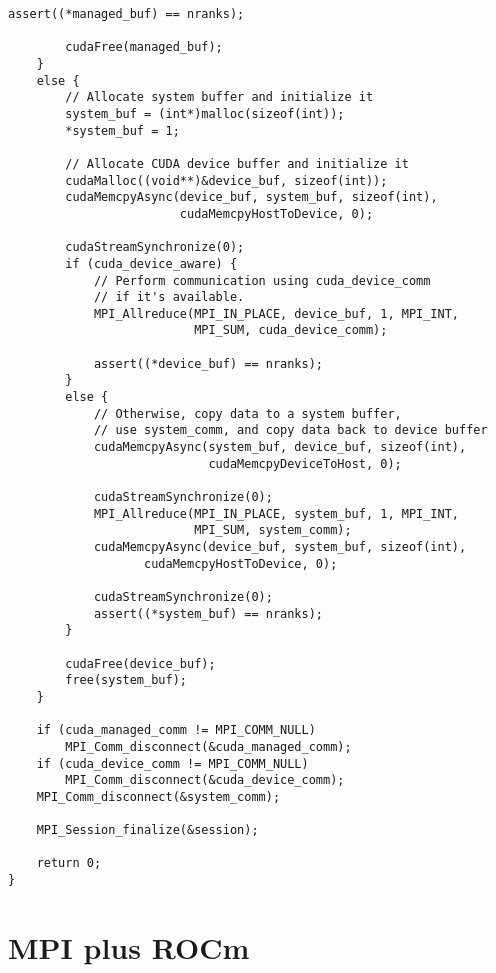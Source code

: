 \begin{example}
\begin{lstlisting}[language={[MPI]C}]
        assert((*managed_buf) == nranks);

        cudaFree(managed_buf);
    }
    else {
        // Allocate system buffer and initialize it
        system_buf = (int*)malloc(sizeof(int));
        *system_buf = 1;

        // Allocate CUDA device buffer and initialize it
        cudaMalloc((void**)&device_buf, sizeof(int));
        cudaMemcpyAsync(device_buf, system_buf, sizeof(int),
                        cudaMemcpyHostToDevice, 0);

        cudaStreamSynchronize(0);
        if (cuda_device_aware) {
            // Perform communication using cuda_device_comm
            // if it's available.
            MPI_Allreduce(MPI_IN_PLACE, device_buf, 1, MPI_INT,
                          MPI_SUM, cuda_device_comm);

            assert((*device_buf) == nranks);
        }
        else {
            // Otherwise, copy data to a system buffer,
            // use system_comm, and copy data back to device buffer
            cudaMemcpyAsync(system_buf, device_buf, sizeof(int),
                            cudaMemcpyDeviceToHost, 0);

            cudaStreamSynchronize(0);
            MPI_Allreduce(MPI_IN_PLACE, system_buf, 1, MPI_INT,
                          MPI_SUM, system_comm);
            cudaMemcpyAsync(device_buf, system_buf, sizeof(int),
                   cudaMemcpyHostToDevice, 0);

            cudaStreamSynchronize(0);
            assert((*system_buf) == nranks);
        }

        cudaFree(device_buf);
        free(system_buf);
    }

    if (cuda_managed_comm != MPI_COMM_NULL)
        MPI_Comm_disconnect(&cuda_managed_comm);
    if (cuda_device_comm != MPI_COMM_NULL)
        MPI_Comm_disconnect(&cuda_device_comm);
    MPI_Comm_disconnect(&system_comm);

    MPI_Session_finalize(&session);

    return 0;
}
\end{lstlisting}
\end{example}

\section{MPI plus ROCm}

